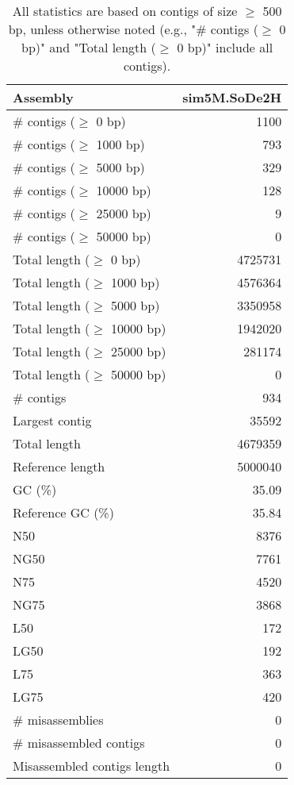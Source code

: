 \documentclass[12pt,a4paper]{article}
\begin{document}
\begin{table}[ht]
\begin{center}
\caption{All statistics are based on contigs of size $\geq$ 500 bp, unless otherwise noted (e.g., "\# contigs ($\geq$ 0 bp)" and "Total length ($\geq$ 0 bp)" include all contigs).}
\begin{tabular}{|l*{1}{|r}|}
\hline
Assembly & sim5M.SoDe2H \\ \hline
\# contigs ($\geq$ 0 bp) & 1100 \\ \hline
\# contigs ($\geq$ 1000 bp) & 793 \\ \hline
\# contigs ($\geq$ 5000 bp) & 329 \\ \hline
\# contigs ($\geq$ 10000 bp) & 128 \\ \hline
\# contigs ($\geq$ 25000 bp) & 9 \\ \hline
\# contigs ($\geq$ 50000 bp) & 0 \\ \hline
Total length ($\geq$ 0 bp) & 4725731 \\ \hline
Total length ($\geq$ 1000 bp) & 4576364 \\ \hline
Total length ($\geq$ 5000 bp) & 3350958 \\ \hline
Total length ($\geq$ 10000 bp) & 1942020 \\ \hline
Total length ($\geq$ 25000 bp) & 281174 \\ \hline
Total length ($\geq$ 50000 bp) & 0 \\ \hline
\# contigs & 934 \\ \hline
Largest contig & 35592 \\ \hline
Total length & 4679359 \\ \hline
Reference length & 5000040 \\ \hline
GC (\%) & 35.09 \\ \hline
Reference GC (\%) & 35.84 \\ \hline
N50 & 8376 \\ \hline
NG50 & 7761 \\ \hline
N75 & 4520 \\ \hline
NG75 & 3868 \\ \hline
L50 & 172 \\ \hline
LG50 & 192 \\ \hline
L75 & 363 \\ \hline
LG75 & 420 \\ \hline
\# misassemblies & 0 \\ \hline
\# misassembled contigs & 0 \\ \hline
Misassembled contigs length & 0 \\ \hline

\end{tabular}
\end{center}
\end{table}
\end{document}
